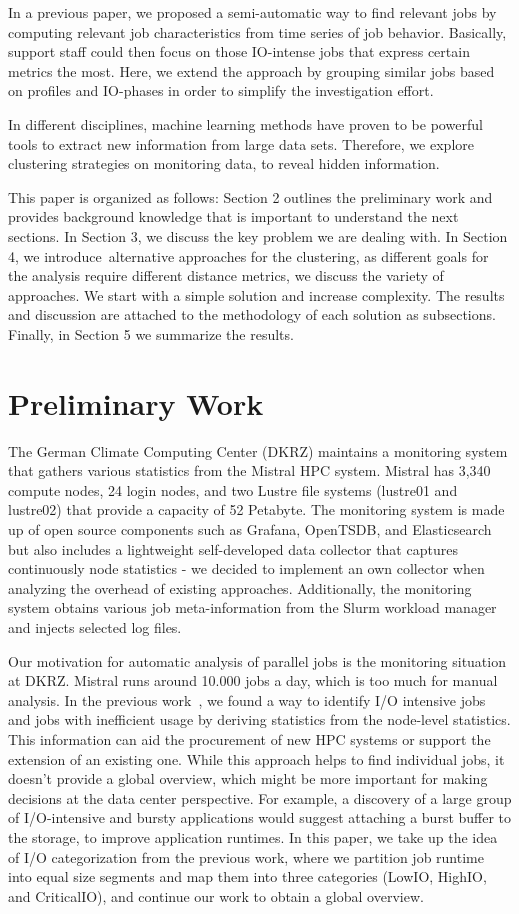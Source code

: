 \documentclass[]{llncs}
\begin{document}
In a previous paper, we proposed a semi-automatic way to find relevant jobs by computing relevant job characteristics from time series of job behavior.
Basically, support staff could then focus on those IO-intense jobs that express certain metrics the most.
Here, we extend the approach by grouping similar jobs based on profiles and IO-phases in order to simplify the investigation effort.

In different disciplines, machine learning methods have proven to be powerful tools to extract new information from large data sets.
Therefore, we explore clustering strategies on monitoring data, to reveal hidden information.

This paper is organized as follows: Section 2 outlines the preliminary work and provides background knowledge that is important to understand the next sections.
In Section 3, we discuss the key problem we are dealing with.
In Section 4, we introduce\ alternative approaches for the clustering, as different goals for the analysis require different distance metrics, we discuss the variety of approaches.
We start with a simple solution and increase complexity.
The results and discussion are attached to the methodology of each solution as subsections.
Finally, in Section 5 we summarize the results.


\section{Preliminary Work}
The German Climate Computing Center (DKRZ) maintains a monitoring system that gathers various statistics from the Mistral HPC system.
Mistral has 3,340 compute nodes, 24 login nodes, and two Lustre file systems (lustre01 and lustre02) that provide a capacity of 52 Petabyte.
The monitoring system is made up of open source components such as Grafana, OpenTSDB, and Elasticsearch but also includes a lightweight self-developed data collector that captures continuously node statistics - we decided to implement an own collector when analyzing the overhead of existing approaches.
Additionally, the monitoring system obtains various job meta-information from the Slurm workload manager and injects selected log files.

Our motivation for automatic analysis of parallel jobs is the monitoring situation at DKRZ.
Mistral runs around 10.000 jobs a day, which is too much for manual analysis.
In the previous work~\cite{iocats2020}, we found a way to identify I/O intensive jobs and jobs with inefficient usage by deriving statistics from the node-level statistics.
This information can aid the procurement of new HPC systems or support the extension of an existing one.
While this approach helps to find individual jobs, it doesn't provide a global overview, which might be more important for making decisions at the data center perspective.
For example, a discovery of a large group of I/O-intensive and bursty applications would suggest attaching a burst buffer to the storage, to improve application runtimes.
In this paper, we take up the idea of I/O categorization from the previous work, where we partition job runtime into equal size segments and map them into three categories (LowIO, HighIO, and CriticalIO), and continue our work to obtain a global overview.
\end{document}
